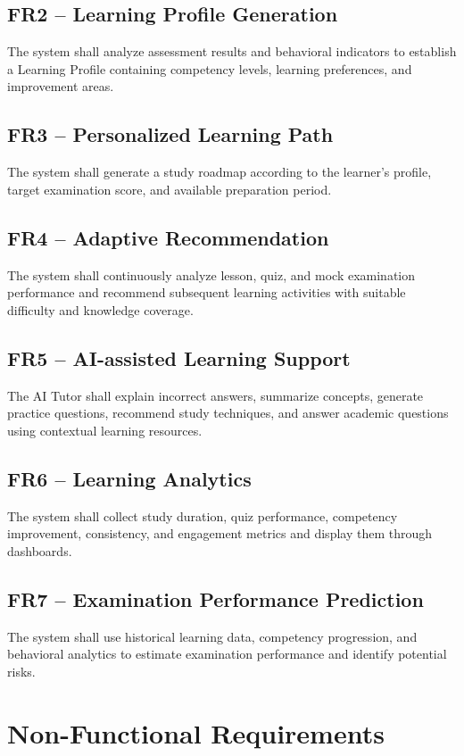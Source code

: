 \documentclass[12pt,a4paper]{report}
\begin{document}
\subsection{FR2 -- Learning Profile Generation}
The system shall analyze assessment results and behavioral indicators to establish a Learning Profile containing competency levels, learning preferences, and improvement areas.

\subsection{FR3 -- Personalized Learning Path}
The system shall generate a study roadmap according to the learner's profile, target examination score, and available preparation period.

\subsection{FR4 -- Adaptive Recommendation}
The system shall continuously analyze lesson, quiz, and mock examination performance and recommend subsequent learning activities with suitable difficulty and knowledge coverage.

\subsection{FR5 -- AI-assisted Learning Support}
The AI Tutor shall explain incorrect answers, summarize concepts, generate practice questions, recommend study techniques, and answer academic questions using contextual learning resources.

\subsection{FR6 -- Learning Analytics}
The system shall collect study duration, quiz performance, competency improvement, consistency, and engagement metrics and display them through dashboards.

\subsection{FR7 -- Examination Performance Prediction}
The system shall use historical learning data, competency progression, and behavioral analytics to estimate examination performance and identify potential risks.

\section{Non-Functional Requirements}
\end{document}
